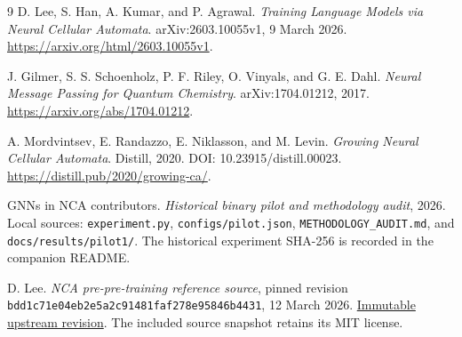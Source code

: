 \documentclass[11pt,a4paper]{article}
\numberwithin{equation}{section}
\newcommand{\1}{\mathbf{1}}
\begin{document}
\begin{thebibliography}{9}
D. Lee, S. Han, A. Kumar, and P. Agrawal.
\emph{Training Language Models via Neural Cellular Automata}.
arXiv:2603.10055v1, 9 March 2026.
\url{https://arxiv.org/html/2603.10055v1}.

J. Gilmer, S. S. Schoenholz, P. F. Riley, O. Vinyals, and G. E. Dahl.
\emph{Neural Message Passing for Quantum Chemistry}.
arXiv:1704.01212, 2017.
\url{https://arxiv.org/abs/1704.01212}.

A. Mordvintsev, E. Randazzo, E. Niklasson, and M. Levin.
\emph{Growing Neural Cellular Automata}.
Distill, 2020. DOI: 10.23915/distill.00023.
\url{https://distill.pub/2020/growing-ca/}.

GNNs in NCA contributors.
\emph{Historical binary pilot and methodology audit}, 2026.
Local sources: \texttt{experiment.py}, \texttt{configs/pilot.json},
\texttt{METHODOLOGY\_AUDIT.md}, and \texttt{docs/results/pilot1/}.
The historical experiment SHA-256 is recorded in the companion README.

D. Lee.
\emph{NCA pre-pre-training reference source}, pinned revision
\texttt{bdd1c71e04eb2e5a2c91481faf278e95846b4431}, 12 March 2026.
\href{https://github.com/danihyunlee/nca-pre-pretraining/tree/bdd1c71e04eb2e5a2c91481faf278e95846b4431}{Immutable upstream revision}.
The included source snapshot retains its MIT license.
\end{thebibliography}
\end{document}

